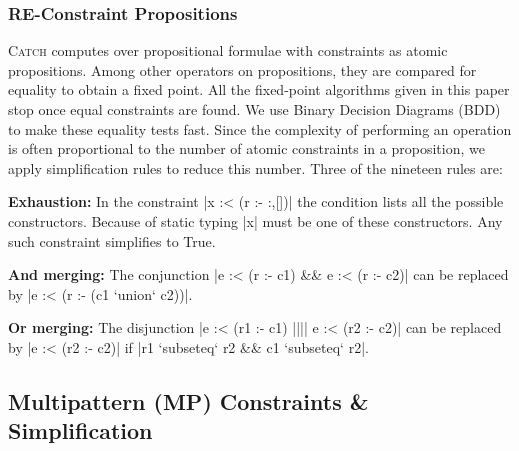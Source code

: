 \documentclass[preprint]{sigplanconf}
\newcommand{\catch}{\textsc{Catch}}
\newcommand{\para}[1]{\vspace{2mm}\noindent\textbf{#1}}
\begin{document}
\subsubsection{RE-Constraint Propositions}
\label{sec:re-propositions}

\catch{} computes over propositional formulae with constraints as atomic propositions. Among other operators on propositions, they are compared for equality to obtain a fixed point. All the fixed-point algorithms given in this paper stop once equal constraints are found. We use Binary Decision Diagrams (BDD) \citep{lee:bdd} to make these equality tests fast. Since the complexity of performing an operation is often proportional to the number of atomic constraints in a proposition, we apply simplification rules to reduce this number. Three of the nineteen rules are:

\para{Exhaustion:} In the constraint |x :< (r :- {:,[]})| the condition lists all the possible constructors. Because of static typing |x| must be one of these constructors. Any such constraint simplifies to True.

\para{And merging:} The conjunction |e :< (r :- c1) && e :< (r :- c2)| can be replaced by |e :< (r :- (c1 `union` c2))|.

\para{Or merging:} The disjunction |e :< (r1 :- c1) |||| e :< (r2 :- c2)| can be replaced by |e :< (r2 :- c2)| if |r1 `subseteq` r2 && c1 `subseteq` r2|.


\subsection{Multipattern (MP) Constraints \& Simplification}
\label{sec:multipattern}
\end{document}
